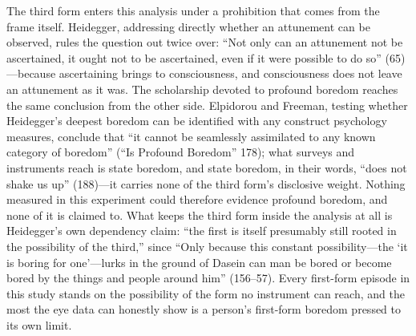 The third form enters this analysis under a prohibition that comes from the frame itself.
Heidegger, addressing directly whether an attunement can be observed, rules the question out
twice over: ``Not only can an attunement not be ascertained, it ought not to be ascertained,
even if it were possible to do so'' (65)---because ascertaining brings to consciousness, and
consciousness does not leave an attunement as it was. The scholarship devoted to profound
boredom reaches the same conclusion from the other side. Elpidorou and Freeman, testing
whether Heidegger's deepest boredom can be identified with any construct psychology measures,
conclude that ``it cannot be seamlessly assimilated to any known category of boredom'' (``Is Profound Boredom'' 178);
what surveys and instruments reach is state boredom, and state boredom, in their words, ``does
not shake us up'' (188)---it carries none of the third form's disclosive weight. Nothing
measured in this experiment could therefore evidence profound boredom, and none of it is claimed to.
What keeps the third form inside the analysis at all is Heidegger's own dependency claim:
``the first is itself presumably still rooted in the possibility of the third,'' since ``Only
because this constant possibility---the `it is boring for one'---lurks in the ground of Dasein
can man be bored or become bored by the things and people around him'' (156--57). Every
first-form episode in this study stands on the possibility of the form no instrument can
reach, and the most the eye data can honestly show is a person's first-form boredom pressed
to its own limit.

